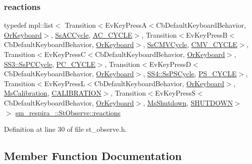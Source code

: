 \subsubsection{\texorpdfstring{reactions}{reactions}}
{\footnotesize\ttfamily typedef mpl\+::list$<$ Transition$<$Ev\+Key\+PressA$<$Cb\+Default\+Keyboard\+Behavior, \hyperlink{classsm__respira__1_1_1OrKeyboard}{Or\+Keyboard}$>$, \hyperlink{structsm__respira__1_1_1SsACCycle}{Ss\+A\+C\+Cycle}, \hyperlink{structsm__respira__1_1_1StObserve_1_1AC__CYCLE}{A\+C\+\_\+\+C\+Y\+C\+LE}$>$, Transition$<$Ev\+Key\+PressB$<$Cb\+Default\+Keyboard\+Behavior, \hyperlink{classsm__respira__1_1_1OrKeyboard}{Or\+Keyboard}$>$, \hyperlink{structsm__respira__1_1_1SsCMVCycle}{Ss\+C\+M\+V\+Cycle}, \hyperlink{structsm__respira__1_1_1StObserve_1_1CMV__CYCLE}{C\+M\+V\+\_\+\+C\+Y\+C\+LE}$>$, Transition$<$Ev\+Key\+PressC$<$Cb\+Default\+Keyboard\+Behavior, \hyperlink{classsm__respira__1_1_1OrKeyboard}{Or\+Keyboard}$>$, \hyperlink{structsm__respira__1_1_1SS3_1_1SsPCCycle}{S\+S3\+::\+Ss\+P\+C\+Cycle}, \hyperlink{structsm__respira__1_1_1StObserve_1_1PC__CYCLE}{P\+C\+\_\+\+C\+Y\+C\+LE}$>$, Transition$<$Ev\+Key\+PressD$<$Cb\+Default\+Keyboard\+Behavior, \hyperlink{classsm__respira__1_1_1OrKeyboard}{Or\+Keyboard}$>$, \hyperlink{structsm__respira__1_1_1SS4_1_1SsPSCycle}{S\+S4\+::\+Ss\+P\+S\+Cycle}, \hyperlink{structsm__respira__1_1_1StObserve_1_1PS__CYCLE}{P\+S\+\_\+\+C\+Y\+C\+LE}$>$, Transition$<$Ev\+Key\+PressL$<$Cb\+Default\+Keyboard\+Behavior, \hyperlink{classsm__respira__1_1_1OrKeyboard}{Or\+Keyboard}$>$, \hyperlink{classsm__respira__1_1_1MsCalibration}{Ms\+Calibration}, \hyperlink{structsm__respira__1_1_1StObserve_1_1CALIBRATION}{C\+A\+L\+I\+B\+R\+A\+T\+I\+ON}$>$, Transition$<$Ev\+Key\+PressS$<$Cb\+Default\+Keyboard\+Behavior, \hyperlink{classsm__respira__1_1_1OrKeyboard}{Or\+Keyboard}$>$, \hyperlink{classsm__respira__1_1_1MsShutdown}{Ms\+Shutdown}, \hyperlink{structsm__respira__1_1_1StObserve_1_1SHUTDOWN}{S\+H\+U\+T\+D\+O\+WN}$>$ $>$ \hyperlink{structsm__respira__1_1_1StObserve_a97f211aa3493cec1e620743b074add48}{sm\+\_\+respira\+\_\+::\+St\+Observe\+::reactions}}



Definition at line 30 of file st\+\_\+observe.\+h.



\subsection{Member Function Documentation}
\mbox{\label{structsm__respira__1_1_1StObserve_a4aa08a7d0471453573d7ad4f4d6797ed}} 
